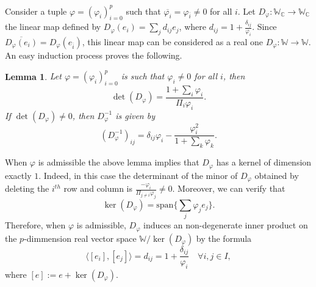 \documentclass{article}
\newtheorem{lema}[thm]{Lemma}
\theoremstyle{remark}
\begin{document}
Consider a tuple $\varphi=(\varphi_i)_{i=0}^p$ such that $\overline{\varphi_i}=\varphi_{\overline{i}}\neq 0$ for all $i$. Let $D_{\varphi}:\mathbb{W}_{\mathbb{C}}\rightarrow\mathbb{W}_{\mathbb{C}}$ the linear map defined by $D_\varphi(e_i)=\sum_{j}d_{ij}e_j$, where $d_{ij}=1+\frac{\delta_{ij}}{\varphi_i}$. Since $\overline{D_\varphi(e_i)}=D_\varphi(e_{\overline{i}})$, this linear map can be considered as a real one $D_\varphi:\mathbb{W}\rightarrow\mathbb{W}$.  An easy induction process proves the following.
\begin{lema}\label{Lema del determinante de D}
    Let $\varphi=(\varphi_i)_{i=0}^p$ is such that $\varphi_i\neq 0$ for all $i$, then
    \begin{equation*}
        \det(D_{\varphi})=\dfrac{1+\sum_i\varphi_i}{\Pi_i\varphi_i}.
    \end{equation*}
    If $\det(D_{\varphi})\neq 0$, then $D_{\varphi}^{-1}$ is given by
    \begin{equation*}
        (D_{\varphi}^{-1})_{ij}=\delta_{ij}\varphi_i-\frac{\varphi^2_i}{1+\sum_k\varphi_k}.
    \end{equation*}
\end{lema}

When $\varphi$ is admissible the above lemma implies that $D_\varphi$ has a kernel of dimension exactly $1$. Indeed, in this case the determinant of the minor of $D_\varphi$ obtained by deleting the $i^{th}$ row and column is $\frac{-\varphi_i}{\Pi_{j\neq i}\varphi_j}\neq 0$. Moreover, we can verify that
\begin{equation}\label{kernel de S}
    \ker(D_{\varphi})=\text{span}\bigg\{\sum_j\varphi_je_j\bigg\}.
\end{equation}
Therefore, when $\varphi$ is admissible, $D_\varphi$ induces an non-degenerate inner product on the $p$-dimmension real vector space $\mathbb{W}/\ker(D_\varphi)$ by the formula 
\begin{equation}\label{producto caso singular}
    \langle [e_i],[e_j]\rangle=d_{ij}=1+\frac{\delta_{ij}}{\varphi_i}\quad\forall i,j\in I,
\end{equation}
where $[e]:=e+\ker(D_\varphi)$.
\end{document}

